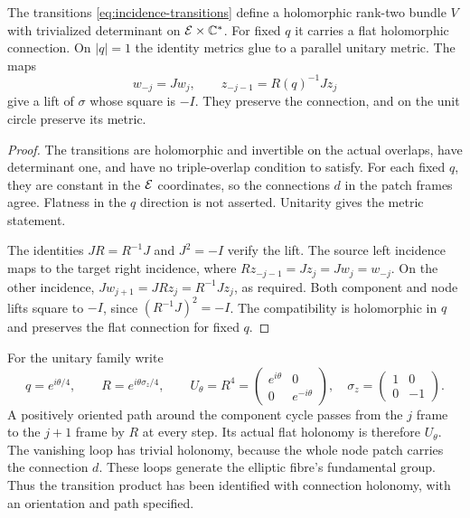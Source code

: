 \begin{proposition}\label{prop:flat-family}
The transitions \eqref{eq:incidence-transitions} define a holomorphic
rank-two bundle $V$ with trivialized determinant on $\mathcal E\times\mathbb C^*$.
For fixed $q$ it carries a flat holomorphic connection. On $|q|=1$ the
identity metrics glue to a parallel unitary metric. The maps
\begin{equation}\label{eq:projective-lift}
 w_{-j}=Jw_j,\qquad z_{-j-1}=R(q)^{-1}Jz_j
\end{equation}
give a lift of $\sigma$ whose square is $-I$. They preserve the connection,
and on the unit circle preserve its metric.
\end{proposition}

\begin{proof}
The transitions are holomorphic and invertible on the actual overlaps,
have determinant one, and have no triple-overlap condition to satisfy.
For each fixed $q$, they are constant in the $\mathcal E$ coordinates, so the
connections $d$ in the patch frames agree. Flatness in the $q$ direction
is not asserted. Unitarity gives the metric statement.

The identities $JR=R^{-1}J$ and $J^2=-I$ verify the lift. The source
left incidence maps to the target right incidence, where
$Rz_{-j-1}=Jz_j=Jw_j=w_{-j}$. On the other incidence,
$Jw_{j+1}=JRz_j=R^{-1}Jz_j$, as required. Both component and node
lifts square to $-I$, since $(R^{-1}J)^2=-I$. The compatibility is
holomorphic in $q$ and preserves the flat connection for fixed $q$.
\end{proof}

For the unitary family write
\begin{equation}\label{eq:unitary-parameter}
 q=e^{i\theta/4},\qquad
 R=e^{i\theta\sigma_z/4},\qquad
 U_\theta=R^4=\begin{pmatrix}e^{i\theta}&0\\0&e^{-i\theta}\end{pmatrix},
 \quad \sigma_z=\begin{pmatrix}1&0\\0&-1\end{pmatrix}.
\end{equation}
A positively oriented path around the component cycle passes from the
$j$ frame to the $j+1$ frame by $R$ at every step. Its actual flat
holonomy is therefore $U_\theta$. The vanishing loop has trivial
holonomy, because the whole node patch carries the connection $d$.
These loops generate the elliptic fibre's fundamental group. Thus the
transition product has been identified with connection holonomy, with
an orientation and path specified.

